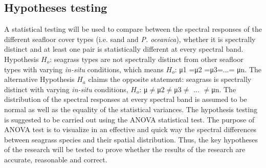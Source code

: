 \documentclass[11pt]{article}
\begin{document}
\subsection{Hypotheses testing}
A statistical testing will be used to compare between the spectral responses of the different seafloor cover types (i.e. sand and \textit{P. oceanica}),
 whether it is spectrally distinct and at least one pair is statistically different at every spectral
band.
Hypothesis $H_o$: seagrass types are not spectrally distinct from other seafloor types with
varying \textit{in-situ} conditions, which means
$H_o$: μ1 =μ2 =μ3=...= μn.
The alternative Hypothesis $H_a$ claims the opposite statement: seagrass is spectrally
distinct with varying \textit{in-situ} conditions, $H_o$: μ$\neq$μ2$\neq$μ3$\neq$ ... $\neq$μn.
The distribution of the spectral responses at every spectral band is assumed to be normal as well as
the equality of the statistical variances.
The hypothesis testing is suggested to be carried out using the \ac{ANOVA} statistical test. The purpose of
\ac{ANOVA} test is to visualize in an effective and quick way the spectral differences between seagrass
species and their spatial distribution. Thus, the key hypotheses of the research will be tested to prove
whether the results of the research are accurate, reasonable and correct.
\end{document}
